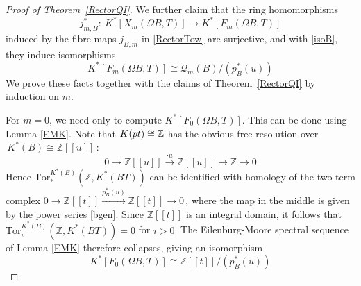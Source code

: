 \documentclass[11pt]{amsart}
\theoremstyle{definition}
\theoremstyle{remark}
\numberwithin{equation}{section}
\newcommand{\la}{\label}
\def\cQ{\mathcal{Q}}
\def\Z{\mathbb{Z}}
\begin{document}
\begin{proof}[Proof of Theorem~\ref{RectorQI}]
We further claim that the ring homomorphisms
%
$$
j_{m,B}^{\ast}:\ K^{\ast}[X_m(\Omega B, T)] \to K^{\ast}[F_m(\Omega B, T)]
$$
%
induced by the fibre maps $ j_{B,m} $ in
\eqref{RectorTow} are surjective, and with \eqref{isoB}, they induce isomorphisms
$$
K^{\ast}[F_m(\Omega B, T)] \cong  \cQ_{m}(B)/(p_B^{\ast}(u))
$$
%
We prove these facts together with the claims of Theorem~\ref{RectorQI} by induction on $m$. 

For $m=0$, we need only to compute $K^{\ast}[F_0(\Omega B, T)]$. This can be done using Lemma \ref{EMK}. Note that $ K({\rm pt}) \cong \Z$ has the obvious free resolution over $\,K^{\ast}(B) \cong \Z[[u]]\,$:
%
\begin{equation} 
\la{zres} 
0 \to \Z[[u]] \xrightarrow{\cdot u}  \Z[[u]] \to \Z \to 0  
\end{equation}
%
Hence $\mathrm{Tor}^{K^{\ast}(B)}_\ast(\Z, K^{\ast}(BT))$ can be identified with homology of the two-term complex $ 0 \to \Z[[t]] \xrightarrow{p^*_B(u)} \Z[[t]] \to 0\,$, where the map in the middle is given by the power series \eqref{bgen}. Since $\Z[[t]]$ is an integral domain, it follows that $\mathrm{Tor}^{K^{\ast}(B)}_i(\Z, K^{\ast}(BT))=0$ for $i>0$. The Eilenburg-Moore spectral sequence of Lemma \ref{EMK} therefore collapses, giving
an isomorphism
%
$$
K^{\ast}[F_0(\Omega B, T)] \cong \Z[[t]]/(p_B^{\ast}(u))
$$
%


\end{proof}
\end{document}
